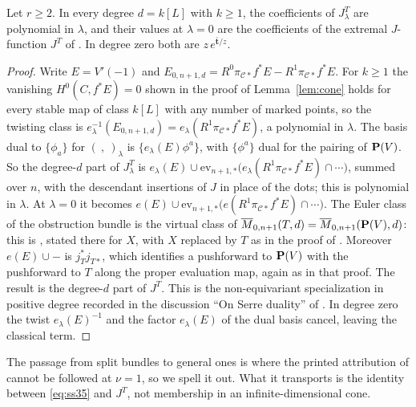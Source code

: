 \begin{lemma}
  \label{lem:limit}
  Let \(r\ge2\).  In every degree \(d=k[L]\) with \(k\ge1\), the
  coefficients of \(J^{T}_{\lambda}\) are polynomial in \(\lambda\), and
  their values at \(\lambda=0\) are the coefficients of the extremal
  \(J\)-function \(J^{T}\) of \cite{SS}.  In degree zero both are
  \(z\,e^{\bar{\mathbf t}/z}\).
\end{lemma}

\begin{proof}
  Write \(E=V'(-1)\) and \(E_{0,n+1,d}=R^{0}\pi_{\mathcal C*}f^{*}E
  -R^{1}\pi_{\mathcal C*}f^{*}E\).  For \(k\ge1\) the vanishing
  \(H^{0}(C,f^{*}E)=0\) shown in the proof of Lemma~\ref{lem:cone} holds for
  every stable map of class \(k[L]\) with any number of marked points, so the
  twisting class is
  \(e_{\lambda}^{-1}(E_{0,n+1,d})=e_{\lambda}(R^{1}\pi_{\mathcal C*}f^{*}E)\),
  a polynomial in \(\lambda\).  The basis dual to \(\{\phi_{a}\}\) for
  \((\ ,\ )_{\lambda}\) is \(\{e_{\lambda}(E)\phi^{a}\}\), with
  \(\{\phi^{a}\}\) dual for the pairing of \(\mathbf P(V)\).  So the
  degree-\(d\) part of \(J^{T}_{\lambda}\) is
  \(e_{\lambda}(E)\cup\mathrm{ev}_{n+1,*}\bigl(e_{\lambda}(R^{1}\pi_{\mathcal
  C*}f^{*}E)\cap\cdots\bigr)\), summed over \(n\), with the descendant
  insertions of \(J\) in place of the dots; this is polynomial in \(\lambda\).
  At \(\lambda=0\) it becomes \(e(E)\cup\mathrm{ev}_{n+1,*}\bigl(e(R^{1}\pi_{\mathcal
  C*}f^{*}E)\cap\cdots\bigr)\).  The Euler class of the obstruction bundle is
  the virtual class of
  \(\overline M_{0,n+1}(T,d)=\overline M_{0,n+1}(\mathbf P(V),d)\): this is
  \cite[Corollary~3.2]{SS}, stated there for \(X\), with \(X\) replaced by
  \(T\) as in the proof of \cite[Theorem~3.3]{SS}.  Moreover
  \(e(E)\cup-\) is \(j_{T}^{*}j_{T*}\), which identifies a pushforward to
  \(\mathbf P(V)\) with the pushforward to \(T\) along the proper evaluation map,
  again as in that proof.  The result is the degree-\(d\) part
  of \(J^{T}\).  This is the non-equivariant specialization in positive degree
  recorded in the discussion ``On Serre duality'' of \cite{CoatesGivental}.  In
  degree zero the twist \(e_{\lambda}(E)^{-1}\) and the factor
  \(e_{\lambda}(E)\) of the dual basis cancel, leaving the classical term.
\end{proof}

The passage from split bundles to general ones is where the printed
attribution of \cite[Remark~4.5(3)]{SS} cannot be followed at \(\nu=1\), so
we spell it out.  What it transports is the identity between
\eqref{eq:ss35} and \(J^{T}\), not membership in an infinite-dimensional
cone.

